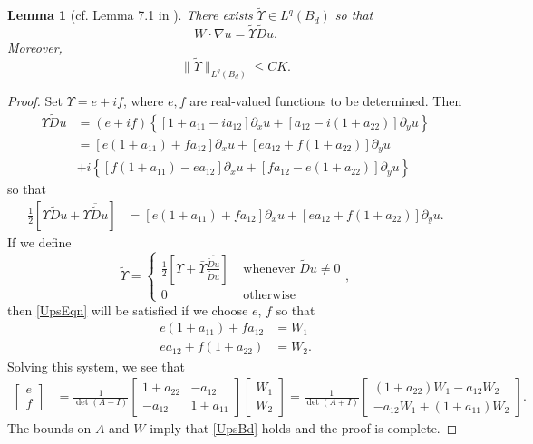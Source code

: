\documentclass[12pt,reqno]{amsart}
\theoremstyle{plain}
\newtheorem{lem}{Lemma}
\theoremstyle{definition}
\newcommand{\del}{ \partial}
\newcommand{\gr}{\nabla}
\newcommand{\set}[1]{\left\{#1\right\}}
\newcommand{\brac}[1]{\left[#1\right]}
\newcommand{\pr}[1]{\left( #1 \right) }
\begin{document}
\begin{lem}[cf. Lemma 7.1 in \cite{DKW17}]
There exists $\widetilde\Upsilon \in L^q\pr{B_d}$ so that 
\begin{equation}
W \cdot \gr u =\widetilde\Upsilon \widetilde D u.
\label{UpsEqn}
\end{equation}
Moreover,
\begin{equation}
\|\widetilde\Upsilon\|_{L^q\pr{B_{d}}} \le C K.
\label{UpsBd}
\end{equation}
\end{lem}

\begin{proof}
Set $\Upsilon = e + i f$, where $e, f$ are real-valued functions to be determined.
Then
\begin{align*}
\Upsilon \widetilde D u 
&= \pr{e + i f} \set{\brac{1 + a_{11} - i a_{12}}\del_x u + \brac{a_{12} - i \pr{1 + a_{22}}}\del_y u} \\
&= \brac{e \pr{1 + a_{11}} + f a_{12}}\del_x u + \brac{e a_{12} + f \pr{1 + a_{22}}} \del_y u \\
&+ i \set{\brac{f\pr{1 + a_{11}} - e a_{12}} \del_x u + \brac{f a_{12} - e\pr{1 + a_{22}}} \del_y u}
\end{align*}
so that
\begin{align*}
\frac{1}{2}\brac{\Upsilon \widetilde D u + \overline{\Upsilon  \widetilde D u} }
&= \brac{e \pr{1 + a_{11}} + f a_{12}}\del_x u + \brac{e a_{12} + f \pr{1 + a_{22}}} \del_y u.
\end{align*}
If we define 
$$\widetilde \Upsilon = \left\{\begin{array}{ll} 
\frac{1}{2}\brac{\Upsilon + \bar {\Upsilon}\frac{ \overline{ \widetilde D u}}{\widetilde D u}} & \text{ whenever }  \widetilde D u \ne 0 \\ 
0 & \text{ otherwise } \end{array}\right.,$$
then \eqref{UpsEqn} will be satisfied if we choose $e$, $f$ so that
\begin{align*}
e \pr{1 + a_{11}} + f a_{12} &= W_1 \\
e a_{12} + f \pr{1 + a_{22}} &= W_2.
\end{align*}
Solving this system, we see that
\begin{align*}
\brac{\begin{array}{l} e \\ f \end{array}} 
&= \frac{1}{\det\pr{A+I}} \brac{\begin{array}{ll} 1 + a_{22} & - a_{12} \\ - a_{12} & 1 + a_{11}  \end{array}}  \brac{\begin{array}{l} W_1\\ W_2  \end{array}} 
=  \frac{1}{\det\pr{A+I}} \brac{\begin{array}{l} \pr{1 + a_{22}} W_1 - a_{12} W_2 \\
- a_{12}W_1 + \pr{1 + a_{11}} W_2   \end{array}}.
\end{align*}
The bounds on $A$ and $W$ imply that \eqref{UpsBd} holds and the proof is complete.
\end{proof}
\end{document}
